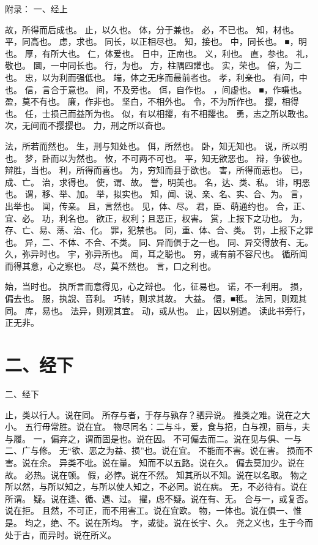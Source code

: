 \documentclass[12pt,UTF8]{ctexbook}
\begin{document}
附录： 一、经上

故，所得而后成也。 
止，以久也。 
体，分于兼也。 
必，不已也。 
知，材也。 
平，同高也。 
虑，求也。 
同长，以正相尽也。 
知，接也。 
中，同长也。 
■，明也。 
厚，有所大也。 
仁，体爱也。 
日中，正南也。 
义，利也。 
直，参也。 
礼，敬也。 
圜，一中同长也。 
行，为也。 
方，柱隅四讙也。 
实，荣也。 
倍，为二也。 
忠，以为利而强低也。 
端，体之无序而最前者也。 
孝，利亲也。 
有间，中也。 
信，言合于意也。 
间，不及旁也。 
佴，自作也。 
，间虚也。 
■，作嗛也。 
盈，莫不有也。 
廉，作非也。 
坚白，不相外也。 
令，不为所作也。 
撄，相得也。 
任，士损己而益所为也。 
似，有以相撄，有不相撄也。 
勇，志之所以敢也。 
次，无间而不撄撄也。 
力，刑之所以奋也。 

法，所若而然也。 
生，刑与知处也。 
佴，所然也。 
卧，知无知也。 
说，所以明也。 
梦，卧而以为然也。 
攸，不可两不可也。 
平，知无欲恶也。 
辩，争彼也。辩胜，当也。 
利，所得而喜也。 
为，穷知而县于欲也。 
害，所得而恶也。 
已，成、亡。 
治，求得也。 
使，谓、故。 
誉，明美也。 
名，达、类、私。 
诽，明恶也。 
谓，移、举、加。 
举，拟实也。 
知，闻、说、亲、名、实、合、为。 
言，出举也。 
闻，传亲。 
且，言然也。 
见，体、尽。 
君，臣、萌通约也。 
合，正、宜、必。 
功，利名也。 
欲正，权利；且恶正，权害。 
赏，上报下之功也。 
为，存、亡、易、荡、治、化。 
罪，犯禁也。 
同，重、体、合、类。 
罚，上报下之罪也。 
异，二、不体、不合、不类。 
同、异而俱于之一也。 
同、异交得放有、无。 
久，弥异时也。 
宇，弥异所也。 
闻，耳之聪也。 
穷，或有前不容尺也。 
循所闻而得其意，心之察也。 
尽，莫不然也。 
言，口之利也。 

始，当时也。 
执所言而意得见，心之辩也。 
化，征易也。 
诺，不一利用。 
损，偏去也。 
服，执誽、音利。 
巧转，则求其故。 
大益。 
儇，■秪。 
法同，则观其同。 
库，易也。 
法异，则观其宜。 
动，或从也。 
止，因以别道。 
读此书旁行，正无非。 


\chapter{二、经下}

二、经下

止，类以行人。说在同。 
所存与者，于存与孰存？驷异说。 
推类之难。说在之大小。 
五行毋常胜。说在宜。 
物尽同名：二与斗，爱，食与招，白与视，丽与，夫与履。 
一，偏弃之，谓而固是也。说在因。 
不可偏去而二。说在见与俱、一与二、广与修。 
无“欲、恶之为益、损”也。说在宜。 
不能而不害。说在害。 
损而不害。说在余。 
异类不吡。说在量。 
知而不以五路。说在久。 
偏去莫加少。说在故。 
必热。说在顿。 
假，必悖。说在不然。 
知其所以不知。说在以名取。 
物之所以然，与所以知之，与所以使人知之，不必同。说在病。 
无，不必待有。说在所谓。 
疑。说在逢、循、遇、过。 
擢，虑不疑。说在有、无。 
合与一，或复否。说在拒。 
且然，不可正，而不用害工。说在宜欧。 
物，一体也。说在俱一、惟是。 
均之，绝、不。说在所均。 
字，或徙。说在长宇、久。 
尧之义也，生于今而处于古，而异时。说在所义。 
\end{document}
